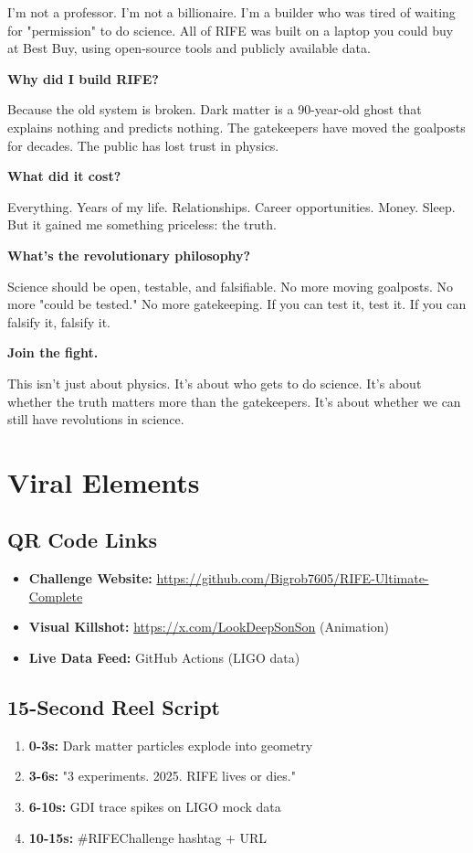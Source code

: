 \documentclass[11pt]{report}
\newcommand{\mainrepo}{\url{https://github.com/Bigrob7605/RIFE-Ultimate-Complete}}
\newcommand{\mainx}{\url{https://x.com/LookDeepSonSon}}
\begin{document}
I'm not a professor. I'm not a billionaire. I'm a builder who was tired of waiting for "permission" to do science. All of RIFE was built on a laptop you could buy at Best Buy, using open-source tools and publicly available data.

\textbf{Why did I build RIFE?}

Because the old system is broken. Dark matter is a 90-year-old ghost that explains nothing and predicts nothing. The gatekeepers have moved the goalposts for decades. The public has lost trust in physics.

\textbf{What did it cost?}

Everything. Years of my life. Relationships. Career opportunities. Money. Sleep. But it gained me something priceless: the truth.

\textbf{What's the revolutionary philosophy?}

Science should be open, testable, and falsifiable. No more moving goalposts. No more "could be tested." No more gatekeeping. If you can test it, test it. If you can falsify it, falsify it.

\textbf{Join the fight.}

This isn't just about physics. It's about who gets to do science. It's about whether the truth matters more than the gatekeepers. It's about whether we can still have revolutions in science.

\section*{Viral Elements}

\subsection*{QR Code Links}
\begin{itemize}
\item \textbf{Challenge Website:} \mainrepo{}
\item \textbf{Visual Killshot:} \mainx{} (Animation)
\item \textbf{Live Data Feed:} GitHub Actions (LIGO data)
\end{itemize}

\subsection*{15-Second Reel Script}
\begin{enumerate}
\item \textbf{0-3s:} Dark matter particles explode into geometry
\item \textbf{3-6s:} "3 experiments. 2025. RIFE lives or dies."
\item \textbf{6-10s:} GDI trace spikes on LIGO mock data
\item \textbf{10-15s:} \#RIFEChallenge hashtag + URL
\end{enumerate}
\end{document}
